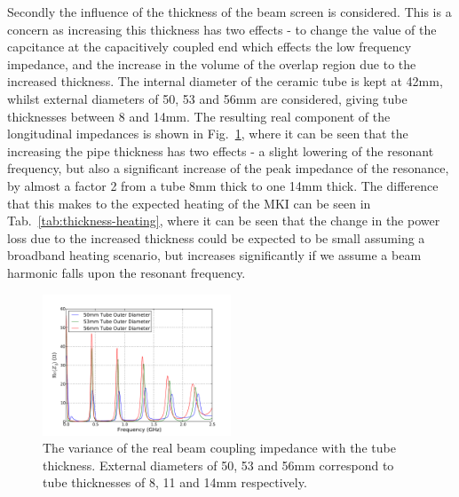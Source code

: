 Secondly the influence of the thickness of the beam screen is considered. This is a concern as increasing this thickness has two effects - to change the value of the capcitance at the capacitively coupled end which effects the low frequency impedance, and the increase in the volume of the overlap region due to the increased thickness. The internal diameter of the ceramic tube is kept at 42mm, whilst external diameters of 50, 53 and 56mm are considered, giving tube thicknesses between 8 and 14mm. The resulting real component of the longitudinal impedances is shown in Fig.~\ref{fig:tube-thickness-imp}, where it can be seen that the increasing the pipe thickness has two effects - a slight lowering of the resonant frequency, but also a significant increase of the peak impedance of the resonance, by almost a factor 2 from a tube 8mm thick to one 14mm thick. The difference that this makes to the expected heating of the MKI can be seen in Tab.~\ref{tab:thickness-heating}, where it can be seen that the change in the power loss due to the increased thickness could be expected to be small assuming a broadband heating scenario, but increases significantly if we assume a beam harmonic falls upon the resonant frequency.

\begin{figure}
\begin{center}
\includegraphics[width=0.5\textwidth]{LHC_MKI/figures/mki-tube-thickness-real.pdf}
\end{center}
\label{fig:tube-thickness-imp}
\caption{The variance of the real beam coupling impedance with the tube thickness. External diameters of 50, 53 and 56mm correspond to tube thicknesses of 8, 11 and 14mm respectively.}
\end{figure}